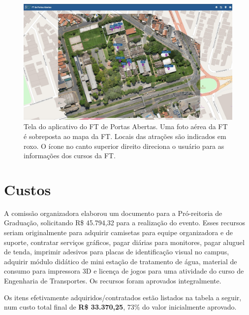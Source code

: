 \documentclass[
  letterpaper,
  DIV=11,
  numbers=noendperiod]{scrreprt}
\begin{document}
\begin{figure}[H]

{\centering \includegraphics[width=1.1\linewidth,height=\textheight,keepaspectratio]{planejamento/app-mapa-Ulisses.jpg}

}

\caption{Tela do aplicativo do FT de Portas Abertas. Uma foto aérea da
FT é sobreposta ao mapa da FT. Locais das atrações são indicados em
roxo. O ícone no canto superior direito direciona o usuário para as
informações dos cursos da FT.}

\end{figure}%


\chapter{Custos}\label{custos}

A comissão organizadora elaborou um documento para a Pró-reitoria de
Graduação, solicitando R\$ 45.794,32 para a realização do evento. Esses
recursos seriam originalmente para adquirir camisetas para equipe
organizadora e de suporte, contratar serviços gráficos, pagar diárias
para monitores, pagar aluguel de tenda, imprimir adesivos para placas de
identificação visual no campus, adquirir módulo didático de mini estação
de tratamento de água, material de consumo para impressora 3D e licença
de jogos para uma atividade do curso de Engenharia de Transportes. Os
recursos foram aprovados integralmente.

Os itens efetivamente adquiridos/contratados estão listados na tabela a
seguir, num custo total final de \textbf{R\$ 33.370,25}, 73\% do valor
inicialmente aprovado.
\end{document}
